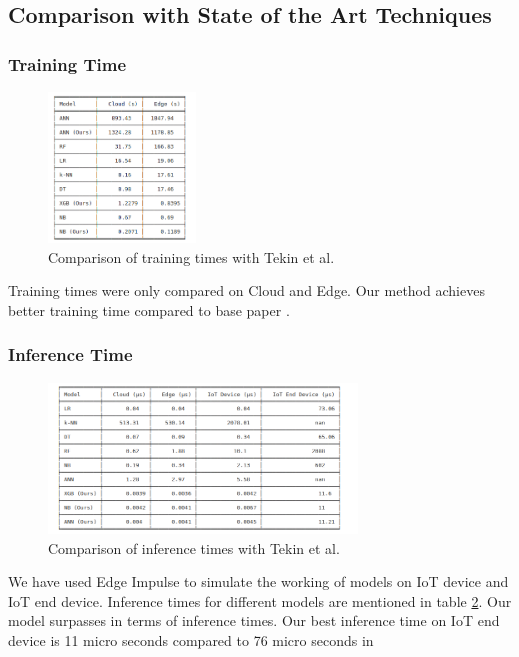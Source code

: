 \documentclass[conference,letterpaper]{IEEEtran}
\begin{document}
\subsection{Comparison with State of the Art Techniques}
\subsubsection{Training Time}
\begin{figure}[H]
    \centering
    \includegraphics[width=\linewidth,height=4cm]{training.png}
    \caption{Comparison of training times with Tekin et al.}
    \label{fig:fs_size}
\end{figure}
Training times were only compared on Cloud and Edge. Our method achieves better training time compared to base paper \cite{basepaper2}.

\subsubsection{Inference Time}
\begin{figure}[H]
    \centering
    \includegraphics[width=\linewidth,height=4cm]{inference.png}
    \caption{Comparison of inference times with Tekin et al. }
    \label{fig:inferenceT}
\end{figure}
We have used Edge Impulse to simulate the working of models on IoT device and IoT end device. 
Inference times for different models are mentioned in table \ref{fig:inferenceT}. Our model surpasses \cite{basepaper2} in terms of inference times. Our best inference time on IoT end device is 11 micro seconds compared to 76 micro seconds in \cite{basepaper2}
\end{document}
